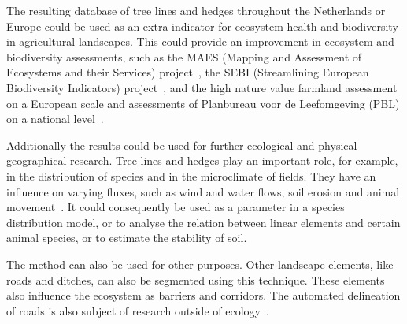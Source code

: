 The resulting database of tree lines and hedges throughout the Netherlands or Europe could be used as an extra indicator for ecosystem health and biodiversity in agricultural landscapes. This could provide an improvement in ecosystem and biodiversity assessments, such as the MAES (Mapping and Assessment of Ecosystems and their Services) project~\citep{maes2013mapping}, the SEBI (Streamlining European Biodiversity Indicators) project~\citep{biala2012streamlining}, and the high nature value 
farmland assessment~\citep{paracchini2008high} on a European scale and assessments of Planbureau voor de Leefomgeving (PBL) on a national level~\citep{bouwma2014biodiversiteit}.

Additionally the results could be used for further ecological and physical geographical research. Tree lines and hedges play an important role, for example, in the distribution of species and in the microclimate of fields. They have an influence on varying fluxes, such as wind and water flows, soil erosion and animal movement~\citep{forman1984hedgerows}. It could consequently be used as a parameter in a species distribution model, or to analyse the relation between linear elements and certain animal species, or to estimate the stability of soil.

The method can also be used for other purposes. Other landscape elements, like roads and ditches, can also be segmented using this technique. These elements also influence the ecosystem as barriers and corridors. The automated delineation of roads is also subject of research outside of ecology~\citep{quackenbush2004review}.



